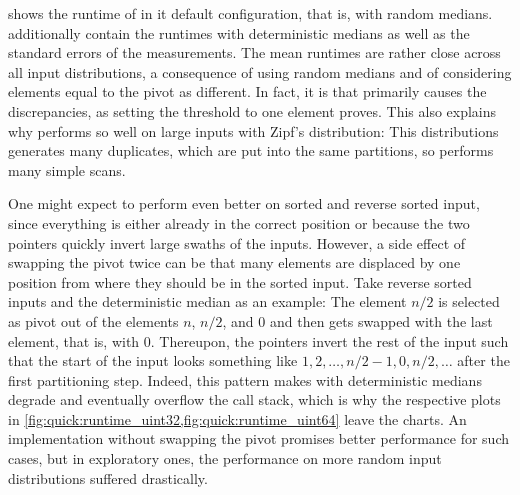  shows the runtime of \QS{} in it default configuration, that is, with random medians.
 additionally contain the runtimes with deterministic medians as well as the standard errors of the measurements.
The mean runtimes are rather close across all input distributions, a consequence of using random medians and of considering elements equal to the pivot as different.
In fact, it is \IS{} that primarily causes the discrepancies, as setting the threshold to one element proves.
This also explains why \QS{} performs so well on large inputs with Zipf's distribution:
This distributions generates many duplicates, which are put into the same partitions, so \IS{} performs many simple scans.

One might expect \QS{} to perform even better on sorted and reverse sorted input, since everything is either already in the correct position or because the two pointers quickly invert large swaths of the inputs.
However, a side effect of swapping the pivot twice can be that many elements are displaced by one position from where they should be in the sorted input.
Take reverse sorted inputs and the deterministic median as an example:
The element \(n/2\) is selected as pivot out of the elements \(n\), \(n/2\), and \(0\) and then gets swapped with the last element, that is, with \(0\).
Thereupon, the pointers invert the rest of the input such that the start of the input looks something like \(1, 2, \dots, n/2-1, 0, n/2, \dots\) after the first partitioning step.
Indeed, this pattern makes \QS{} with deterministic medians degrade and eventually overflow the call stack, which is why the respective plots in \cref{fig:quick:runtime_uint32,fig:quick:runtime_uint64} leave the charts.
An implementation without swapping the pivot promises better performance for such cases, but in exploratory ones, the performance on more random input distributions suffered drastically.
